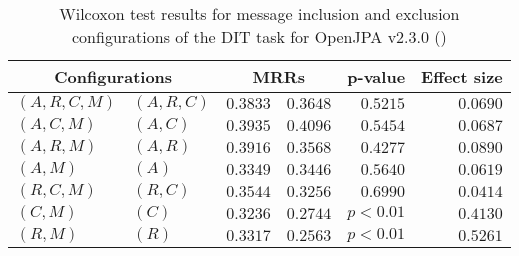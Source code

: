 
\begin{table}
\begin{spacing}{1.2}
\centering
\caption{Wilcoxon test results for message inclusion and exclusion configurations of the DIT task for OpenJPA v2.3.0 (\ctwo)}
\label{table:versus-wilcox-openjpa-dit-message}
\begin{tabular}{ll|rr|rr}
\toprule
      \multicolumn{2}{c|}{Configurations} &                \multicolumn{2}{c|}{MRRs} &             p-value & Effect size \\
\midrule
 $(A,R,C,M)$ &  $(A,R,C)$ &  $\bm{0.3833}$ &       $0.3648$ & $0.5215$ &    $0.0690$ \\
   $(A,C,M)$ &    $(A,C)$ &       $0.3935$ &  $\bm{0.4096}$ & $0.5454$ &    $0.0687$ \\
   $(A,R,M)$ &    $(A,R)$ &  $\bm{0.3916}$ &       $0.3568$ & $0.4277$ &    $0.0890$ \\
     $(A,M)$ &      $(A)$ &       $0.3349$ &  $\bm{0.3446}$ & $0.5640$ &    $0.0619$ \\
   $(R,C,M)$ &    $(R,C)$ &  $\bm{0.3544}$ &       $0.3256$ & $0.6990$ &    $0.0414$ \\
     $(C,M)$ &      $(C)$ &  $\bm{0.3236}$ &       $0.2744$ & $p<0.01$ &    $0.4130$ \\
     $(R,M)$ &      $(R)$ &  $\bm{0.3317}$ &       $0.2563$ & $p<0.01$ &    $0.5261$ \\
\bottomrule
\end{tabular}

\end{spacing}
\end{table}

